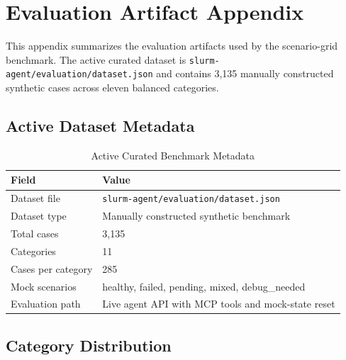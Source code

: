 \chapter{Evaluation Artifact Appendix}
\label{appendix:test-cases}

This appendix summarizes the evaluation artifacts used by the scenario-grid benchmark. The active curated dataset is \texttt{slurm-agent/evaluation/dataset.json} and contains 3,135 manually constructed synthetic cases across eleven balanced categories. 

\section{Active Dataset Metadata}

\begin{table}[H]
\centering
\caption{Active Curated Benchmark Metadata}
\label{tab:appendix-active-dataset-meta}
\begin{tabular}{|l|l|}
\hline
\textbf{Field} & \textbf{Value} \\
\hline
Dataset file & \texttt{slurm-agent/evaluation/dataset.json} \\
Dataset type & Manually constructed synthetic benchmark \\
Total cases & 3,135 \\
Categories & 11 \\
Cases per category & 285 \\
Mock scenarios & healthy, failed, pending, mixed, debug\_needed \\
Evaluation path & Live agent API with MCP tools and mock-state reset \\
\hline
\end{tabular}
\end{table}

\section{Category Distribution}

